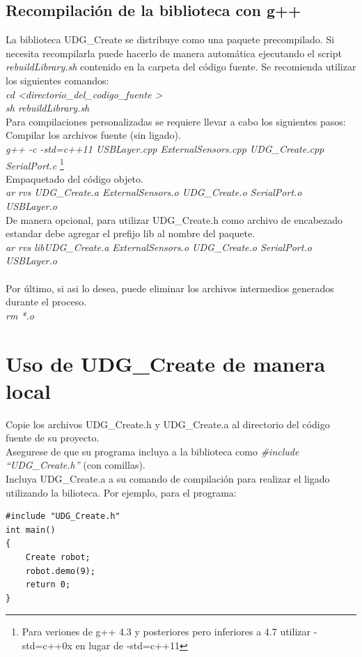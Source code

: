 \documentclass[letterpaper,openright,12pt]{book}
\begin{document}
\subsection{Recompilación de la biblioteca con g++}
La biblioteca UDG\_Create se distribuye como una paquete precompilado. Si necesita recompilarla puede hacerlo de manera automática ejecutando el script \emph{rebuildLibrary.sh} contenido en la carpeta del código fuente. Se recomienda utilizar los siguientes comandos:\\
\emph{cd \textless directorio\_del\_codigo\_fuente \textgreater}\\
\emph{sh rebuildLibrary.sh}\\
Para compilaciones personalizadas se requiere llevar a cabo los siguientes pasos:\\
Compilar los archivos fuente (sin ligado).\\
\emph{g++ -c -std=c++11  USBLayer.cpp  ExternalSensors.cpp  UDG\_Create.cpp SerialPort.c }\footnote{Para veriones de g++ 4.3 y posteriores pero inferiores a 4.7 utilizar -std=c++0x en lugar de -std=c++11} \\
Empaquetado del código objeto.\\
\emph{ar rvs UDG\_Create.a ExternalSensors.o  UDG\_Create.o SerialPort.o USBLayer.o}\\
De manera opcional, para utilizar UDG\_Create.h como archivo de encabezado estandar debe agregar el prefijo lib al nombre del paquete.\\
\emph{\emph{ar rvs libUDG\_Create.a ExternalSensors.o  UDG\_Create.o SerialPort.o USBLayer.o}\\}\\
Por último, si asi lo desea, puede eliminar los archivos intermedios generados durante el proceso.\\
\emph{rm *.o}
\section{Uso de UDG\_Create de manera local}
Copie los archivos UDG\_Create.h y UDG\_Create.a al directorio del código fuente de su proyecto.\\
Asegurese de que su programa incluya a la biblioteca como \emph{\#include ``UDG\_Create.h''} (con comillas).\\
Incluya UDG\_Create.a a su comando de compilación para realizar el ligado utilizando la bilioteca. Por ejemplo, para el programa:\\


\begin{lstlisting}[caption={main.cpp}]
#include "UDG_Create.h"
int main()
{
	Create robot;
	robot.demo(9);
	return 0;
}

\end{lstlisting}
\end{document}
